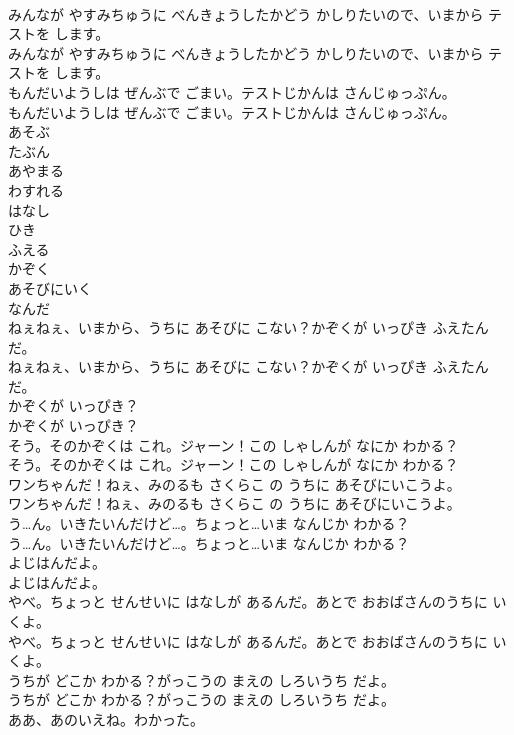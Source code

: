 \documentclass[8pt]{extreport}
\begin{document}
\begin{CJK}{UTF8}{min}
\\	みんなが やすみちゅうに べんきょうしたかどう かしりたいので、いまから テストを します。	
\\	みんなが やすみちゅうに べんきょうしたかどう かしりたいので、いまから テストを します。 
\\	もんだいようしは ぜんぶで ごまい。テストじかんは さんじゅっぷん。	
\\	もんだいようしは ぜんぶで ごまい。テストじかんは さんじゅっぷん。 
\\	あそぶ
\\	たぶん
\\	あやまる
\\	わすれる
\\	はなし
\\	ひき
\\	ふえる
\\	かぞく
\\	あそびにいく
\\	なんだ
\\	ねぇねぇ、いまから、うちに あそびに こない？かぞくが いっぴき ふえたんだ。	
\\	ねぇねぇ、いまから、うちに あそびに こない？かぞくが いっぴき ふえたんだ。 
\\	かぞくが いっぴき？	
\\	かぞくが いっぴき？ 
\\	そう。そのかぞくは これ。ジャーン！この しゃしんが なにか わかる？	
\\	そう。そのかぞくは これ。ジャーン！この しゃしんが なにか わかる？ 
\\	ワンちゃんだ！ねぇ、みのるも さくらこ の うちに あそびにいこうよ。	
\\	ワンちゃんだ！ねぇ、みのるも さくらこ の うちに あそびにいこうよ。 
\\	う…ん。いきたいんだけど…。ちょっと…いま なんじか わかる？	
\\	う…ん。いきたいんだけど…。ちょっと…いま なんじか わかる？ 
\\	よじはんだよ。	
\\	よじはんだよ。 
\\	やべ。ちょっと せんせいに はなしが あるんだ。あとで おおばさんのうちに いくよ。	
\\	やべ。ちょっと せんせいに はなしが あるんだ。あとで おおばさんのうちに いくよ。 
\\	うちが どこか わかる？がっこうの まえの しろいうち だよ。	
\\	うちが どこか わかる？がっこうの まえの しろいうち だよ。 
\\	ああ、あのいえね。わかった。	

\end{CJK}
\end{document}
